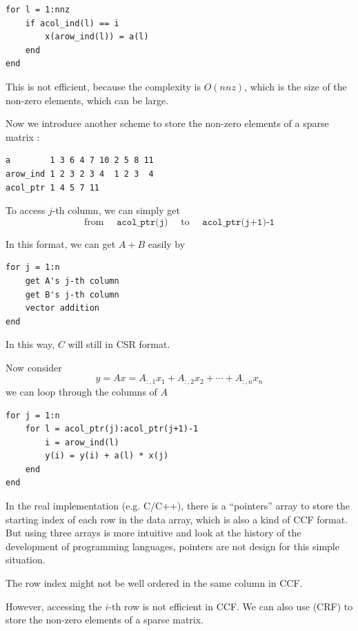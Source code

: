 \begin{verbatim}
for l = 1:nnz
    if acol_ind(l) == i
        x(arow_ind(l)) = a(l)
    end
end
\end{verbatim}

This is not efficient, because the complexity is $O(nnz)$, which is the size of the non-zero elements, which can be large.

Now we introduce another scheme to store the non-zero elements of a sparse matrix :

\begin{verbatim}
a        1 3 6 4 7 10 2 5 8 11
arow_ind 1 2 3 2 3 4  1 2 3  4
acol_ptr 1 4 5 7 11
\end{verbatim}

To access $j$-th column, we can simply get \[
\text{from } \quad \texttt{acol\_ptr(j)} \quad  \text{ to } \quad \texttt{acol\_ptr(j+1)-1}
\]

In this format, we can get $A+B$ easily by
\begin{verbatim}
for j = 1:n
    get A's j-th column
    get B's j-th column
    vector addition
end
\end{verbatim}

In this way, $C$ will still in CSR format.

Now consider $$
y = Ax = A_{:,1} x_1 + A_{:,2} x_2 + \cdots + A_{:,n} x_n
$$
we can loop through the columns of $A$
\begin{verbatim}
for j = 1:n
    for l = acol_ptr(j):acol_ptr(j+1)-1
        i = arow_ind(l)
        y(i) = y(i) + a(l) * x(j)
    end
end
\end{verbatim}

\begin{note}
    In the real implementation (e.g. C/C++), there is a ``pointers'' array to store the starting index of each row in the data array, which is also a kind of CCF format. But using three arrays is more intuitive and look at the history of the development of programming languages, pointers are not design for this simple situation.
\end{note}

\begin{remark}
    The row index might not be well ordered in the same column in CCF.
\end{remark}

However, accessing the $i$-th row is not efficient in CCF. We can also use  (CRF) to store the non-zero elements of a sparse matrix.

